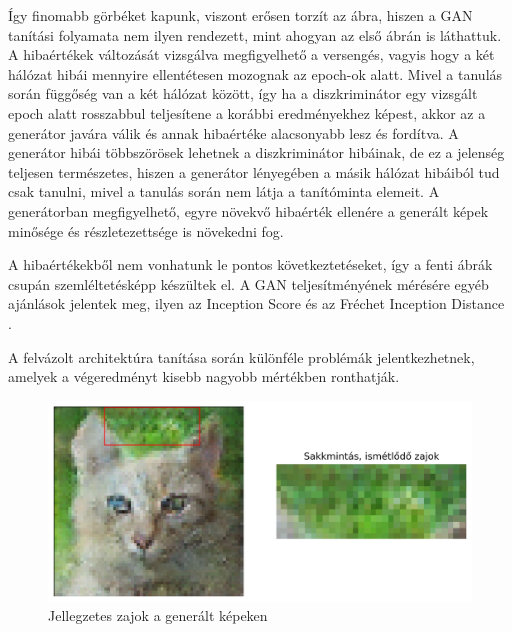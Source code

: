 Így finomabb görbéket kapunk, viszont erősen torzít az ábra, hiszen a GAN tanítási folyamata nem ilyen rendezett, mint ahogyan az első ábrán is láthattuk.
A hibaértékek változását vizsgálva megfigyelhető a versengés, vagyis hogy a két hálózat hibái mennyire ellentétesen mozognak az epoch-ok alatt. Mivel a tanulás során függőség van a két hálózat között, így ha a diszkriminátor egy vizsgált epoch alatt rosszabbul teljesítene a korábbi eredményekhez képest, akkor az a generátor javára válik és annak hibaértéke alacsonyabb lesz és fordítva. A generátor hibái többszörösek lehetnek a diszkriminátor hibáinak, de ez a jelenség teljesen természetes, hiszen a generátor lényegében a másik hálózat hibáiból tud csak tanulni, mivel a tanulás során nem látja a tanítóminta elemeit. A generátorban megfigyelhető, egyre növekvő hibaérték ellenére a generált képek minősége és részletezettsége is növekedni fog.

A hibaértékekből nem vonhatunk le pontos következtetéseket, így a fenti ábrák csupán szemléltetésképp készültek el. A GAN teljesítményének mérésére egyéb ajánlások jelentek meg, ilyen az Inception Score \cite{salimans2016improved} és az Fréchet Inception Distance \cite{heusel2017gans}.


A felvázolt architektúra tanítása során különféle problémák jelentkezhetnek, amelyek a végeredményt kisebb nagyobb mértékben ronthatják.

\begin{figure}[h]
	\centering
	\includegraphics[width=13cm]{images/chessboard-patterns.png}
	\caption{Jellegzetes zajok a generált képeken}
	\label{fig:chessboard-patterns}
\end{figure}


